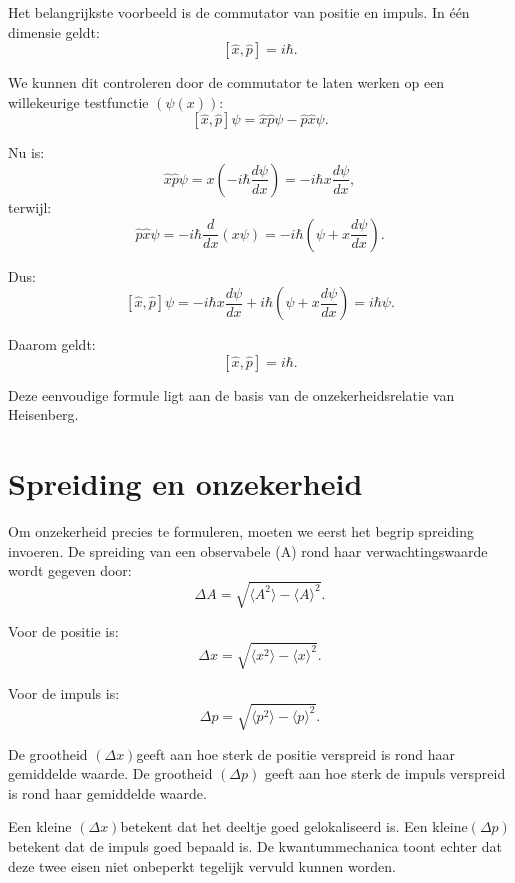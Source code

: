 \documentclass{report} %
\begin{document}
    Het belangrijkste voorbeeld is de commutator van positie en impuls. In één dimensie geldt:
    \[
        [\hat{x},\hat{p}]=i\hbar.
    \]

    We kunnen dit controleren door de commutator te laten werken op een willekeurige testfunctie $(\psi(x))$:
    \[
        [\hat{x},\hat{p}]\psi
        =
        \hat{x}\hat{p}\psi-\hat{p}\hat{x}\psi.
    \]

    Nu is:
    \[
        \hat{x}\hat{p}\psi
        =
        x\left(-i\hbar\frac{d\psi}{dx}\right)
        =
        -i\hbar x\frac{d\psi}{dx},
    \]
    terwijl:
    \[
        \hat{p}\hat{x}\psi
        =
        -i\hbar\frac{d}{dx}(x\psi)
        =
        -i\hbar
        \left(
            \psi+x\frac{d\psi}{dx}
        \right).
    \]

    Dus:
    \[
        [\hat{x},\hat{p}]\psi
        =
        -i\hbar x\frac{d\psi}{dx}
        +
        i\hbar
        \left(
            \psi+x\frac{d\psi}{dx}
        \right)
        =
        i\hbar\psi.
    \]

    Daarom geldt:
    \[
        [\hat{x},\hat{p}]=i\hbar.
    \]

    Deze eenvoudige formule ligt aan de basis van de onzekerheidsrelatie van Heisenberg.


    \section{Spreiding en onzekerheid}

    Om onzekerheid precies te formuleren, moeten we eerst het begrip spreiding invoeren. De spreiding van een observabele (A) rond haar verwachtingswaarde wordt gegeven door:
    \[
        \Delta A
        =
        \sqrt{
            \langle A^2\rangle-\langle A\rangle^2
        }.
    \]

    Voor de positie is:
    \[
        \Delta x
        =
        \sqrt{
            \langle x^2\rangle-\langle x\rangle^2
        }.
    \]

    Voor de impuls is:
    \[
        \Delta p
        =
        \sqrt{
            \langle p^2\rangle-\langle p\rangle^2
        }.
    \]

    De grootheid $(\Delta x) $geeft aan hoe sterk de positie verspreid is rond haar gemiddelde waarde. De grootheid $(\Delta p)$ geeft aan hoe sterk de impuls verspreid is rond haar gemiddelde waarde.

    Een kleine $(\Delta x) $betekent dat het deeltje goed gelokaliseerd is. Een kleine$ (\Delta p)$ betekent dat de impuls goed bepaald is. De kwantummechanica toont echter dat deze twee eisen niet onbeperkt tegelijk vervuld kunnen worden.
\end{document}
